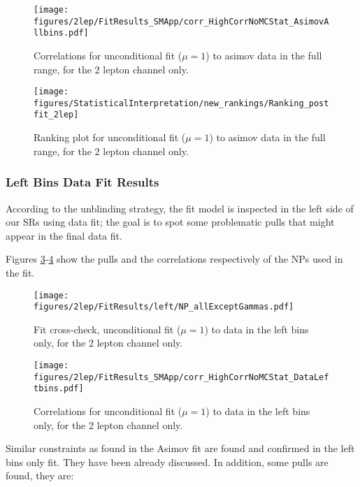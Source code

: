 \begin{figure}[ht]
      \centering
        \texttt{[image: figures/2lep/FitResults\_SMApp/corr\_HighCorrNoMCStat\_AsimovAllbins.pdf]}
        \caption{Correlations for unconditional fit ($\mu=1$) to asimov data in the full range, for the 2 lepton channel only.}
       \label{fig:fit_2lep_corr_all}
\end{figure}

\begin{figure}[ht]
      \centering
        \texttt{[image: figures/StatisticalInterpretation/new\_rankings/Ranking\_postfit\_2lep]}
        \caption{Ranking plot for unconditional fit ($\mu=1$) to asimov data in the full range, for the 2 lepton channel only.}
       \label{fig:fit_2lep_ranking_all}
\end{figure}

\subsubsection{Left Bins Data Fit Results}

According to the unblinding strategy, the fit model is inspected in the left side of our SRs using data fit; 
the goal is to spot some problematic pulls that might appear in the final data fit.

Figures \ref{fig:fit_2lep_fcc_left}-\ref{fig:fit_2lep_corr_left}
show the pulls and the correlations respectively of the NPs used in the fit.

\begin{figure}[ht]
      \centering
        \texttt{[image: figures/2lep/FitResults/left/NP\_allExceptGammas.pdf]}
        \caption{Fit cross-check, unconditional fit ($\mu=1$) to data in the left bins only, for the 2 lepton channel only.}
       \label{fig:fit_2lep_fcc_left}
\end{figure}

\begin{figure}[ht]
      \centering
        \texttt{[image: figures/2lep/FitResults\_SMApp/corr\_HighCorrNoMCStat\_DataLeftbins.pdf]}
        \caption{Correlations for unconditional fit ($\mu=1$) to data in the left bins only, for the 2 lepton channel only.}
       \label{fig:fit_2lep_corr_left}
\end{figure}

Similar constraints as found in the Asimov fit are found and confirmed in the left bins only fit. 
They have been already discussed. 
In addition, some pulls are found, they are:

